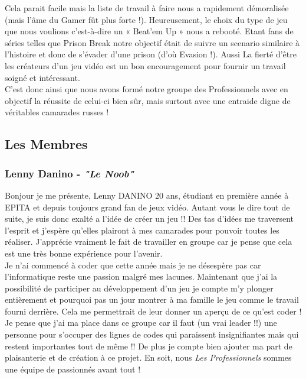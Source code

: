 \documentclass{report}
\begin{document}
	Cela parait facile mais la liste de travail à faire nous a rapidement démoralisée (mais l’âme du Gamer fût plus forte !). Heureusement, le choix du type de jeu que nous voulions c'est-à-dire un « Beat’em Up » nous a rebooté. Etant fans de séries telles que Prison Break notre objectif était de suivre un scenario similaire à l’histoire et donc de s’évader d’une prison (d’où Evasion !). Aussi La fierté d’être les créateurs d’un jeu vidéo est un bon encouragement pour fournir un travail soigné et intéressant.\\

	C’est donc ainsi que nous  avons formé notre groupe des Professionnels avec en objectif la réussite de celui-ci bien sûr, mais surtout avec une entraide digne de véritables camarades russes !\\

\subsection[Les Membres]{Les Membres}
\vspace{0.5cm}

\subsubsection*{Lenny Danino - \textcolor{pseudorouge}{\textit{"Le Noob"}}}

Bonjour je me présente, Lenny DANINO 20 ans, étudiant en première année à EPITA et depuis toujours grand fan de jeux vidéo. Autant vous le dire tout de suite, je suis donc exalté a l’idée de créer un jeu !! Des tas d’idées me traversent l’esprit et j’espère qu’elles plairont à mes camarades pour pouvoir toutes les réaliser. J'apprécie vraiment le fait de travailler en groupe car je pense que cela est une très bonne expérience pour l’avenir.\\

	Je n’ai commencé à coder que cette année mais je ne désespère pas car l’informatique reste une passion malgré mes lacunes. Maintenant que j’ai la possibilité de participer au développement d’un jeu je compte m’y plonger entièrement et pourquoi pas un jour montrer à ma famille le jeu comme le travail fourni derrière. Cela me permettrait de leur donner un aperçu de ce qu'est coder !\\

	Je pense que j’ai ma place dans ce groupe car il faut (un vrai leader !!) une personne pour s’occuper des lignes de codes qui paraissent insignifiantes mais qui restent importantes tout de même !! De plus je compte bien ajouter ma part de plaisanterie et de création à ce projet. En soit, nous \emph{Les Professionnels} sommes une équipe de passionnés avant tout !
\end{document}

